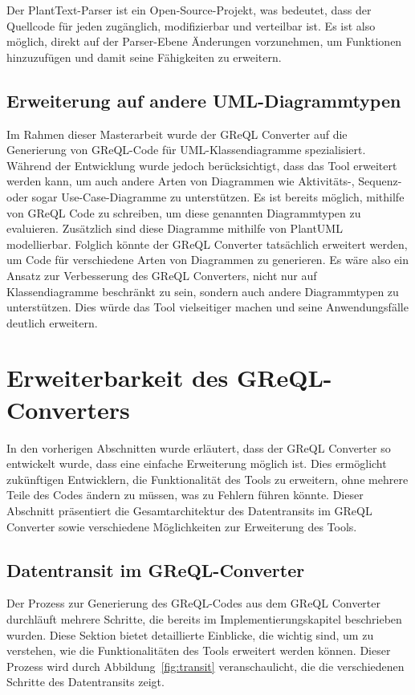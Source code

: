 Der PlantText-Parser ist ein Open-Source-Projekt, was bedeutet, dass der Quellcode für jeden zugänglich,
modifizierbar und verteilbar ist. Es ist also möglich, direkt auf der Parser-Ebene Änderungen vorzunehmen, um Funktionen
hinzuzufügen und damit seine Fähigkeiten zu erweitern.


\subsection{Erweiterung auf andere UML-Diagrammtypen}

Im Rahmen dieser Masterarbeit wurde der GReQL Converter auf die Generierung von GReQL-Code für UML-Klassendiagramme
spezialisiert. Während der Entwicklung wurde jedoch berücksichtigt, dass das Tool erweitert werden kann, um auch andere
Arten von Diagrammen wie Aktivitäts-, Sequenz- oder sogar Use-Case-Diagramme zu unterstützen. Es ist bereits möglich,
mithilfe von GReQL Code zu schreiben, um diese genannten Diagrammtypen zu evaluieren. Zusätzlich sind diese Diagramme
mithilfe von PlantUML modellierbar. Folglich könnte der GReQL Converter tatsächlich erweitert werden, um Code für
verschiedene Arten von Diagrammen zu generieren. Es wäre also ein Ansatz zur Verbesserung des GReQL Converters, nicht
nur auf Klassendiagramme beschränkt zu sein, sondern auch andere Diagrammtypen zu unterstützen. Dies würde das Tool
vielseitiger machen und seine Anwendungsfälle deutlich erweitern.

\section{Erweiterbarkeit des GReQL-Converters}

In den vorherigen Abschnitten wurde erläutert, dass der GReQL Converter so entwickelt wurde, dass eine einfache 
Erweiterung möglich ist. Dies ermöglicht zukünftigen Entwicklern, die Funktionalität des Tools zu erweitern, ohne 
mehrere Teile des Codes ändern zu müssen, was zu Fehlern führen könnte. Dieser Abschnitt präsentiert die 
Gesamtarchitektur des Datentransits im GReQL Converter sowie verschiedene Möglichkeiten zur Erweiterung des Tools.

\subsection{Datentransit im GReQL-Converter}

Der Prozess zur Generierung des GReQL-Codes aus dem GReQL Converter durchläuft mehrere Schritte, die bereits im
Implementierungskapitel beschrieben wurden. Diese Sektion bietet detaillierte Einblicke, die wichtig sind, um zu
verstehen, wie die Funktionalitäten des Tools erweitert werden können. Dieser Prozess wird durch
Abbildung~\ref{fig:transit} veranschaulicht, die die verschiedenen Schritte des Datentransits zeigt.



